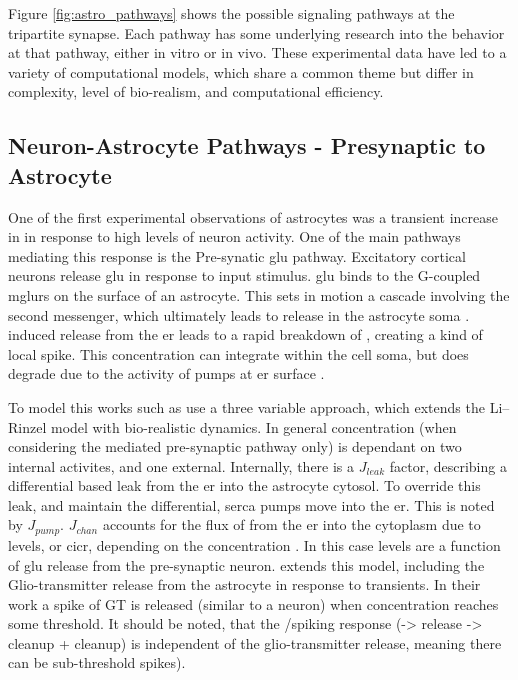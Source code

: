     Figure \ref{fig:astro_pathways} shows the possible signaling pathways at the
    tripartite synapse. Each pathway has some underlying research into the
    behavior at that pathway, either in vitro or in vivo. These experimental data
    have led to a variety of computational models, which share a common theme but
    differ in complexity, level of bio-realism, and computational efficiency.

    \subsection{Neuron-Astrocyte Pathways - Presynaptic to Astrocyte}

    One of the first experimental observations of astrocytes was a transient
    increase in \ca in response to high levels of neuron activity. One of the
    main pathways mediating this response is the Pre-synatic \gls{glu}
    pathway. Excitatory cortical neurons release \gls{glu} in response to input
    stimulus. \Gls{glu} binds to the G-coupled \glspl{mglur} on the surface
    of an astrocyte. This sets in motion a cascade involving the \ipt second
    messenger, which ultimately leads to \ca release in the astrocyte soma
    \parencite{pitta_2012}. \ipt induced \ca release from the \gls{er} leads to a rapid
    breakdown of \ipt, creating a kind of local \ca spike. This \ca
    concentration can integrate within the cell soma, but does degrade due to
    the activity of pumps at \gls{er} surface \parencite{pitta_2012}.

    To model this works such as \parencite{pitta_2009} use a three variable
    approach, which extends the Li–Rinzel model with bio-realistic \ipt
    dynamics. In general \ca concentration (when considering the \ipt mediated
    pre-synaptic pathway only) is dependant on two internal activites, and one
    external. Internally, there is a $J_{leak}$ factor, describing a
    differential based leak from the \gls{er} into the astrocyte cytosol. To
    override this leak, and maintain the differential, \gls{serca} pumps move
    \ca into the \gls{er}. This is noted by $J_{pump}$. $J_{chan}$ accounts for
    the flux of \ca from the \gls{er} into the cytoplasm due to \ipt levels, or
    \gls{cicr}, depending on the \ca concentration \parencite{pitta_2009}. In
    this case \ipt levels are a function of \gls{glu} release from the
    pre-synaptic neuron. \parencite{pitta_2016} extends this model, including
    the Glio-transmitter release from the astrocyte in response to \ca
    transients. In their work a spike of GT is released (similar to a neuron)
    when \ca concentration reaches some threshold. It should be noted, that the
    \ipt/\ca spiking response (\ipt -> \ca release -> \ipt cleanup + \ca
    cleanup) is independent of the glio-transmitter release, meaning there can
    be sub-threshold \ca spikes).

